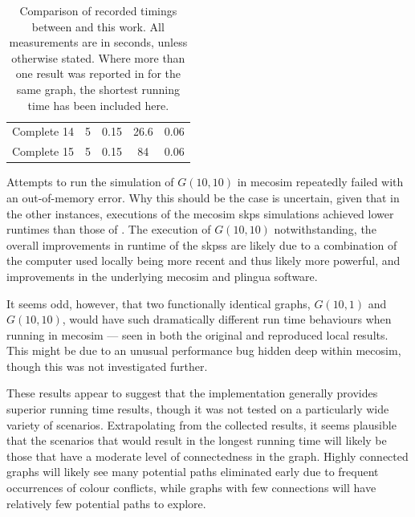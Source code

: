 \begin{table}
\begin{tabular}{@{}lcccc@{}}
Complete 14 & 5                                                            & \num{0.15}                                                           & \num{26.6} & \num{0.06}                                                       \\
Complete 15 & 5                                                            & \num{0.15}                                                           & 84   & \num{0.06}                                                       \\ \bottomrule
\end{tabular}%
\caption[Comparison of recorded timings between \cite{Gheorghe2013} and this work]{Comparison of recorded timings between \cite{Gheorghe2013} and this work.  All measurements are in seconds, unless otherwise stated.  Where more than one result was reported in \cite{Gheorghe2013} for the same graph, the shortest running time has been included here.}
\label{tab:gcol:timings}
\end{table}

Attempts to run the simulation of \(G(10,10)\) in \gls{mecosim} repeatedly failed with an out-of-memory error.  Why this should be the case is uncertain, given that in the other instances, executions of the \gls{mecosim} \gls{skps} simulations achieved lower runtimes than those of \cite{Gheorghe2013}.  The execution of \(G(10,10)\) notwithstanding, the overall improvements in runtime of the \glspl{skps} are likely due to a combination of the computer used locally being more recent and thus likely more powerful, and improvements in the underlying \gls{mecosim} and \gls{plingua} software.

It seems odd, however, that two functionally identical graphs, \(G(10,1)\) and \(G(10,10)\), would have such dramatically different run time behaviours when running in \gls{mecosim} --- seen in both the original and reproduced local results.  This might be due to an unusual performance bug hidden deep within \gls{mecosim}, though this was not investigated further.

These results appear to suggest that the \fsharp{} implementation generally provides superior running time results, though it was not tested on a particularly wide variety of scenarios.  Extrapolating from the collected results, it seems plausible that the scenarios that would result in the longest running time will likely be those that have a moderate level of connectedness in the graph.  Highly connected graphs will likely see many potential paths eliminated early due to frequent occurrences of colour conflicts, while graphs with few connections will have relatively few potential paths to explore.

